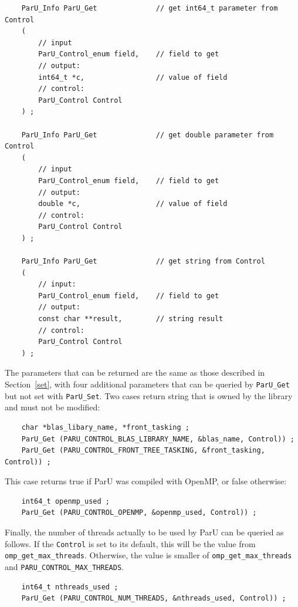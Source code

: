 \documentclass[12pt]{article}
\begin{document}
    {\footnotesize
    \begin{verbatim}
    ParU_Info ParU_Get              // get int64_t parameter from Control
    (
        // input
        ParU_Control_enum field,    // field to get
        // output:
        int64_t *c,                 // value of field
        // control:
        ParU_Control Control
    ) ;

    ParU_Info ParU_Get              // get double parameter from Control
    (
        // input
        ParU_Control_enum field,    // field to get
        // output:
        double *c,                  // value of field
        // control:
        ParU_Control Control
    ) ;

    ParU_Info ParU_Get              // get string from Control
    (
        // input:
        ParU_Control_enum field,    // field to get
        // output:
        const char **result,        // string result
        // control:
        ParU_Control Control
    ) ; \end{verbatim}}

The parameters that can be returned are the same as those described in
Section~\ref{set}, with four additional parameters that can be queried by
\verb'ParU_Get' but not set with \verb'ParU_Set'.  Two cases return string that
is owned by the library and must not be modified:

    {\footnotesize
    \begin{verbatim}
    char *blas_libary_name, *front_tasking ;
    ParU_Get (PARU_CONTROL_BLAS_LIBRARY_NAME, &blas_name, Control)) ;
    ParU_Get (PARU_CONTROL_FRONT_TREE_TASKING, &front_tasking, Control)) ; \end{verbatim}}

This case returns true if ParU was compiled with OpenMP, or false otherwise:

    {\footnotesize
    \begin{verbatim}
    int64_t openmp_used ;
    ParU_Get (PARU_CONTROL_OPENMP, &openmp_used, Control)) ; \end{verbatim}}

Finally, the number of threads actually to be used by ParU can be queried as
follows.  If the \verb'Control' is set to its default, this will be the value
from \verb'omp_get_max_threads'.  Otherwise, the value is smaller of
\verb'omp_get_max_threads' and \verb'PARU_CONTROL_MAX_THREADS'.

    {\footnotesize
    \begin{verbatim}
    int64_t nthreads_used ;
    ParU_Get (PARU_CONTROL_NUM_THREADS, &nthreads_used, Control)) ; \end{verbatim}}
\end{document}
